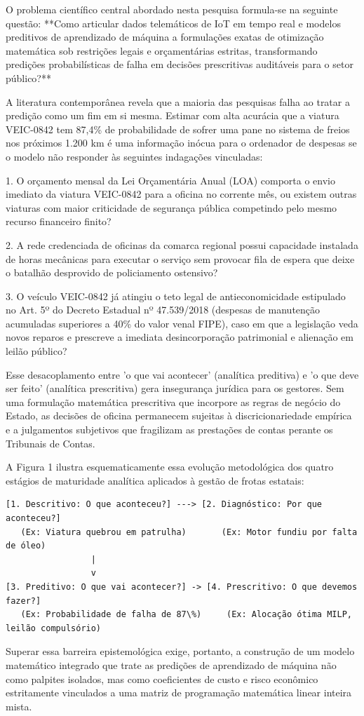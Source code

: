 \documentclass[10pt,a4paper,journal]{article}
\begin{document}
O problema científico central abordado nesta pesquisa formula-se na seguinte questão: **Como articular dados telemáticos de IoT em tempo real e modelos preditivos de aprendizado de máquina a formulações exatas de otimização matemática sob restrições legais e orçamentárias estritas, transformando predições probabilísticas de falha em decisões prescritivas auditáveis para o setor público?**

A literatura contemporânea revela que a maioria das pesquisas falha ao tratar a predição como um fim em si mesma. Estimar com alta acurácia que a viatura VEIC-0842 tem 87,4\% de probabilidade de sofrer uma pane no sistema de freios nos próximos 1.200 km é uma informação inócua para o ordenador de despesas se o modelo não responder às seguintes indagações vinculadas:

1. O orçamento mensal da Lei Orçamentária Anual (LOA) comporta o envio imediato da viatura VEIC-0842 para a oficina no corrente mês, ou existem outras viaturas com maior criticidade de segurança pública competindo pelo mesmo recurso financeiro finito?

2. A rede credenciada de oficinas da comarca regional possui capacidade instalada de horas mecânicas para executar o serviço sem provocar fila de espera que deixe o batalhão desprovido de policiamento ostensivo?

3. O veículo VEIC-0842 já atingiu o teto legal de antieconomicidade estipulado no Art. 5º do Decreto Estadual nº 47.539/2018 (despesas de manutenção acumuladas superiores a 40\% do valor venal FIPE), caso em que a legislação veda novos reparos e prescreve a imediata desincorporação patrimonial e alienação em leilão público?

Esse desacoplamento entre 'o que vai acontecer' (analítica preditiva) e 'o que deve ser feito' (analítica prescritiva) gera insegurança jurídica para os gestores. Sem uma formulação matemática prescritiva que incorpore as regras de negócio do Estado, as decisões de oficina permanecem sujeitas à discricionariedade empírica e a julgamentos subjetivos que fragilizam as prestações de contas perante os Tribunais de Contas.

A Figura 1 ilustra esquematicamente essa evolução metodológica dos quatro estágios de maturidade analítica aplicados à gestão de frotas estatais:

\begin{verbatim}
[1. Descritivo: O que aconteceu?] ---> [2. Diagnóstico: Por que aconteceu?]
   (Ex: Viatura quebrou em patrulha)       (Ex: Motor fundiu por falta de óleo)
                 |
                 v
[3. Preditivo: O que vai acontecer?] -> [4. Prescritivo: O que devemos fazer?]
   (Ex: Probabilidade de falha de 87\%)     (Ex: Alocação ótima MILP, leilão compulsório)
\end{verbatim}
Superar essa barreira epistemológica exige, portanto, a construção de um modelo matemático integrado que trate as predições de aprendizado de máquina não como palpites isolados, mas como coeficientes de custo e risco econômico estritamente vinculados a uma matriz de programação matemática linear inteira mista.
\end{document}
